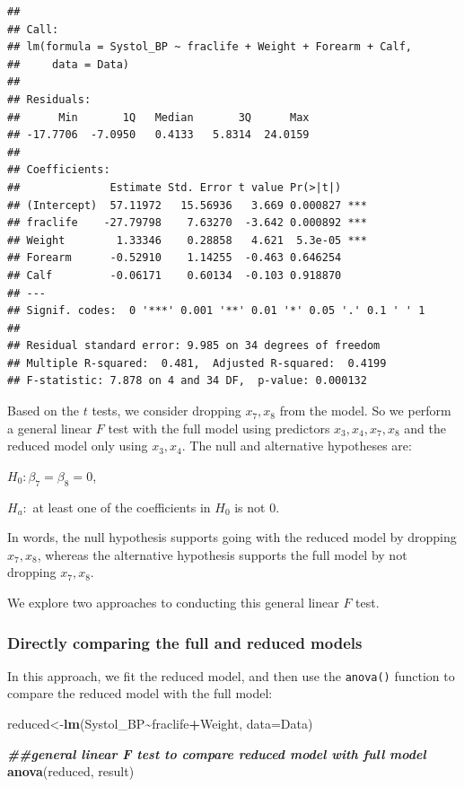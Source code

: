 \documentclass[
]{book}
\newenvironment{Shaded}{\begin{snugshade}}{\end{snugshade}}
\newcommand{\AttributeTok}[1]{\textcolor[rgb]{0.13,0.29,0.53}{#1}}
\newcommand{\DocumentationTok}[1]{\textcolor[rgb]{0.56,0.35,0.01}{\textbf{\textit{#1}}}}
\newcommand{\FunctionTok}[1]{\textcolor[rgb]{0.13,0.29,0.53}{\textbf{#1}}}
\newcommand{\NormalTok}[1]{#1}
\newcommand{\OtherTok}[1]{\textcolor[rgb]{0.56,0.35,0.01}{#1}}
\newcommand{\SpecialCharTok}[1]{\textcolor[rgb]{0.81,0.36,0.00}{\textbf{#1}}}
\begin{document}
\begin{verbatim}
## 
## Call:
## lm(formula = Systol_BP ~ fraclife + Weight + Forearm + Calf, 
##     data = Data)
## 
## Residuals:
##      Min       1Q   Median       3Q      Max 
## -17.7706  -7.0950   0.4133   5.8314  24.0159 
## 
## Coefficients:
##              Estimate Std. Error t value Pr(>|t|)    
## (Intercept)  57.11972   15.56936   3.669 0.000827 ***
## fraclife    -27.79798    7.63270  -3.642 0.000892 ***
## Weight        1.33346    0.28858   4.621  5.3e-05 ***
## Forearm      -0.52910    1.14255  -0.463 0.646254    
## Calf         -0.06171    0.60134  -0.103 0.918870    
## ---
## Signif. codes:  0 '***' 0.001 '**' 0.01 '*' 0.05 '.' 0.1 ' ' 1
## 
## Residual standard error: 9.985 on 34 degrees of freedom
## Multiple R-squared:  0.481,  Adjusted R-squared:  0.4199 
## F-statistic: 7.878 on 4 and 34 DF,  p-value: 0.000132
\end{verbatim}

Based on the \(t\) tests, we consider dropping \(x_7, x_8\) from the model. So we perform a general linear \(F\) test with the full model using predictors \(x_3, x_4, x_7, x_8\) and the reduced model only using \(x_3, x_4\). The null and alternative hypotheses are:

\(H_0: \beta_7 = \beta_8 =0\),

\(H_a:\) at least one of the coefficients in \(H_0\) is not 0.

In words, the null hypothesis supports going with the reduced model by dropping \(x_7, x_8\), whereas the alternative hypothesis supports the full model by not dropping \(x_7, x_8\).

We explore two approaches to conducting this general linear \(F\) test.

\hypertarget{directly-comparing-the-full-and-reduced-models}{%
\subsubsection*{Directly comparing the full and reduced models}\label{directly-comparing-the-full-and-reduced-models}}

In this approach, we fit the reduced model, and then use the \texttt{anova()} function to compare the reduced model with the full model:

\begin{Shaded}
\begin{Highlighting}[]
\NormalTok{reduced}\OtherTok{\textless{}{-}}\FunctionTok{lm}\NormalTok{(Systol\_BP}\SpecialCharTok{\textasciitilde{}}\NormalTok{fraclife}\SpecialCharTok{+}\NormalTok{Weight, }\AttributeTok{data=}\NormalTok{Data)}

\DocumentationTok{\#\#general linear F test to compare reduced model with full model}
\FunctionTok{anova}\NormalTok{(reduced, result)}
\end{Highlighting}
\end{Shaded}
\end{document}
